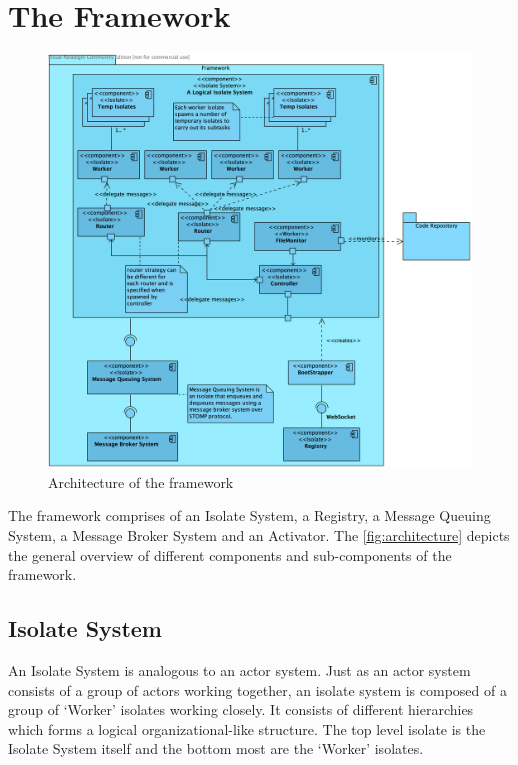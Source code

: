 \section{The Framework}
\begin{figure}[H]
  \centering
  \includegraphics[width=1\textwidth]{figures/componentDiagram}
  \caption[Architecture of the framework]{Architecture of the framework}
  \label{fig:architecture}
\end{figure}


The framework comprises of an Isolate System, a Registry, a Message Queuing System, a Message Broker System and an Activator. The \autoref{fig:architecture} depicts the general overview of different components and sub-components of the framework.

  \subsection{Isolate System}
  An Isolate System is analogous to an actor system. Just as an actor system consists of a group of actors working together, an isolate system is composed of a group of ‘Worker’ isolates working closely. It consists of different hierarchies which forms a logical organizational-like structure. The top level isolate is the Isolate System itself and the bottom most are the ‘Worker’ isolates.

